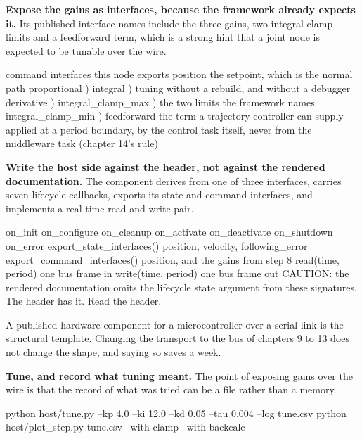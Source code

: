 \begin{steps}
\item \textbf{Expose the gains as interfaces, because the framework already
expects it.} Its published interface names include the three gains, two integral
clamp limits and a feedforward term, which is a strong hint that a joint node is
expected to be tunable over the wire.
\begin{plaincode}
command interfaces this node exports
  position            the setpoint, which is the normal path
  proportional        )
  integral            )  tuning without a rebuild, and without a debugger
  derivative          )
  integral_clamp_max  )  the two limits the framework names
  integral_clamp_min  )
  feedforward         the term a trajectory controller can supply
applied                at a period boundary, by the control task itself,
                       never from the middleware task (chapter 14's rule)
\end{plaincode}

\item \textbf{Write the host side against the header, not against the rendered
documentation.} The component derives from one of three interfaces, carries seven
lifecycle callbacks, exports its state and command interfaces, and implements a
real-time read and write pair.
\begin{plaincode}
on_init  on_configure  on_cleanup  on_activate  on_deactivate  on_shutdown
on_error
export_state_interfaces()      position, velocity, following_error
export_command_interfaces()    position, and the gains from step 8
read(time, period)             one bus frame in
write(time, period)            one bus frame out
CAUTION: the rendered documentation omits the lifecycle state argument from
these signatures. The header has it. Read the header.
\end{plaincode}
A published hardware component for a microcontroller over a serial link is the
structural template. Changing the transport to the bus of chapters 9 to 13 does
not change the shape, and saying so saves a week.

\item \textbf{Tune, and record what tuning meant.} The point of exposing gains
over the wire is that the record of what was tried can be a file rather than a
memory.
\begin{shellcode}
python host/tune.py --kp 4.0 --ki 12.0 --kd 0.05 --tau 0.004 --log tune.csv
python host/plot_step.py tune.csv --with clamp --with backcalc
\end{shellcode}
\end{steps}

